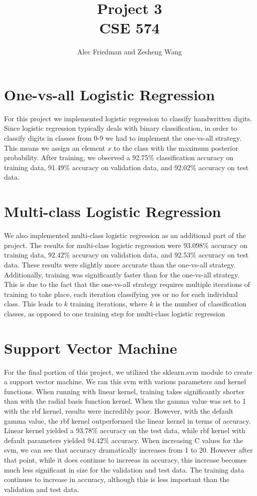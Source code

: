 \documentclass[14pt,A4]{article}
\title{Project 3 \\
        \large CSE 574}
\author{Alec Friedman and Zesheng Wang}
\begin{document}
    \maketitle
    \section*{One-vs-all Logistic Regression}
    For this project we implemented logistic regression to classify handwritten digits. Since logistic regression typically deals with binary classification, in order to classify digits in classes from 0-9 we had to implement the one-vs-all strategy. This means we assign an element $x$ to the class with the maximum posterior probability. After training, we observed a 92.75\% classification accuracy on training data, 91.49\% accuracy on validation data, and 92.02\% accuracy on test data.

    \section*{Multi-class Logistic Regression}
    We also implemented multi-class logistic regression as an additional part of the project. The results for multi-class logistic regression were 93.098\% accuracy on training data, 92.42\% accuracy on validation data, and 92.53\% accuracy on test data. These results were slightly more accurate than the one-vs-all strategy. Additionally, training was significantly faster than for the one-vs-all strategy. This is due to the fact that the one-vs-all strategy requires multiple iterations of training to take place, each iteration classifying yes or no for each individual class. This leads to $k$ training iterations, where $k$ is the number of classification classes, as opposed to one training step for multi-class logistic regression

    \section*{Support Vector Machine}
    For the final portion of this project, we utilized the sklearn.svm module to create a support vector machine. We ran this svm with various parameters and kernel functions. When running with linear kernel, training takes significantly shorter than with the radial basis function kernel. When the gamma value was set to 1 with the rbf kernel, results were incredibly poor. However, with the default gamma value, the rbf kernel outperformed the linear kernel in terms of accuracy. Linear kernel yielded a 93.78\% accuracy on the test data, while rbf kernel with default parameters yielded 94.42\% accuracy. When increasing C values for the svm, we can see that accuracy dramatically increases from 1 to 20. However after that point, while it does continue to increeas in accuracy, this increase becomes much less significant in size for the validation and test data. The training data continues to increase in accuracy, although this is less important than the validation and test data.
\end{document}
